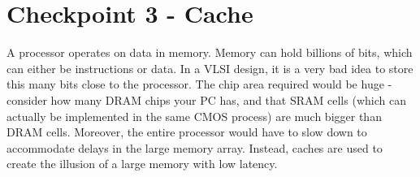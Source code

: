 \documentclass[11pt]{article}
\begin{document}



\newpage
\section{Checkpoint 3 - Cache}
A processor operates on data in memory. Memory can hold billions of bits, which can either be instructions or data. In a VLSI design, it is a very bad idea to store this many bits close to the processor. The chip area required would be huge - consider how many DRAM chips your PC has, and that SRAM cells (which can actually be implemented in the same CMOS process) are much bigger than DRAM cells. Moreover, the entire processor would have to slow down to accommodate delays in the large memory array. Instead, caches are used to create the illusion of a large memory with low latency.
\end{document}

